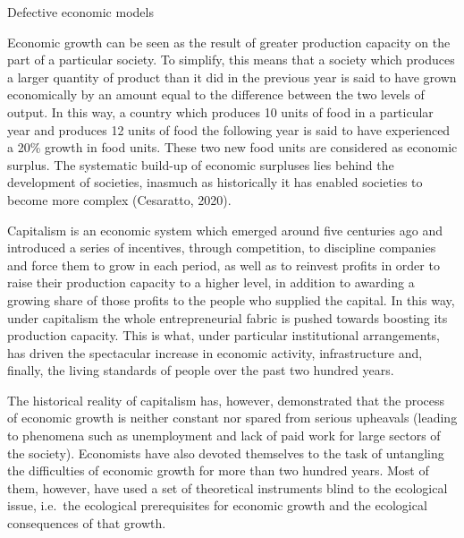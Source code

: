 \documentclass[
]{book}
\begin{document}
Defective economic models

Economic growth can be seen as the result of greater production capacity on the part of a particular society. To simplify, this means that a society which produces a larger quantity of product than it did in the previous year is said to have grown economically by an amount equal to the difference between the two levels of output. In this way, a country which produces 10 units of food in a particular year and produces 12 units of food the following year is said to have experienced a 20\% growth in food units. These two new food units are considered as economic surplus. The systematic build-up of economic surpluses lies behind the development of societies, inasmuch as historically it has enabled societies to become more complex (Cesaratto, 2020).

Capitalism is an economic system which emerged around five centuries ago and introduced a series of incentives, through competition, to discipline companies and force them to grow in each period, as well as to reinvest profits in order to raise their production capacity to a higher level, in addition to awarding a growing share of those profits to the people who supplied the capital. In this way, under capitalism the whole entrepreneurial fabric is pushed towards boosting its production capacity. This is what, under particular institutional arrangements, has driven the spectacular increase in economic activity, infrastructure and, finally, the living standards of people over the past two hundred years.

The historical reality of capitalism has, however, demonstrated that the process of economic growth is neither constant nor spared from serious upheavals (leading to phenomena such as unemployment and lack of paid work for large sectors of the society). Economists have also devoted themselves to the task of untangling the difficulties of economic growth for more than two hundred years. Most of them, however, have used a set of theoretical instruments blind to the ecological issue, i.e.~the ecological prerequisites for economic growth and the ecological consequences of that growth.
\end{document}
